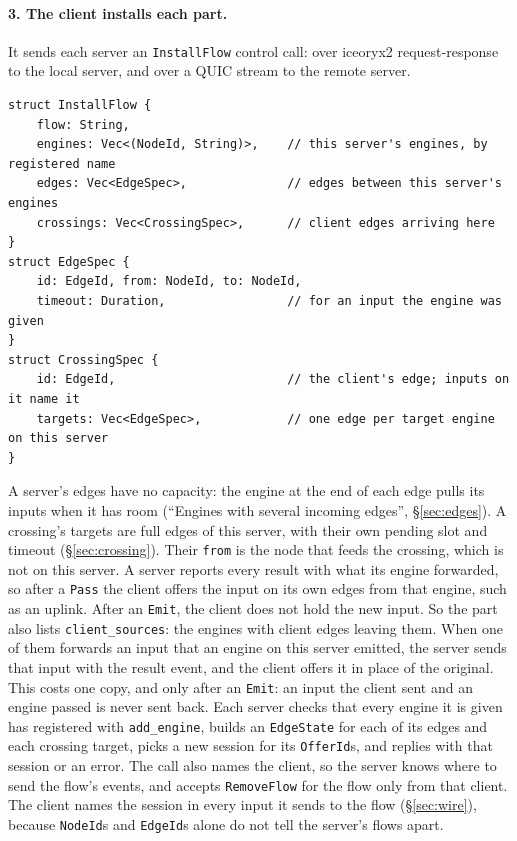 \documentclass[11pt]{article}
\newcommand{\code}[1]{\texttt{#1}}
\begin{document}
\paragraph{3. The client installs each part.} It sends each server an
\code{InstallFlow} control call: over iceoryx2 request-response to the local
server, and over a QUIC stream to the remote server.
\begin{lstlisting}
struct InstallFlow {
    flow: String,
    engines: Vec<(NodeId, String)>,    // this server's engines, by registered name
    edges: Vec<EdgeSpec>,              // edges between this server's engines
    crossings: Vec<CrossingSpec>,      // client edges arriving here
}
struct EdgeSpec {
    id: EdgeId, from: NodeId, to: NodeId,
    timeout: Duration,                 // for an input the engine was given
}
struct CrossingSpec {
    id: EdgeId,                        // the client's edge; inputs on it name it
    targets: Vec<EdgeSpec>,            // one edge per target engine on this server
}
\end{lstlisting}
A server's edges have no capacity: the engine at the end of each edge pulls
its inputs when it has room (``Engines with several incoming edges'',
\S\ref{sec:edges}). A crossing's targets are full edges of this server, with
their own pending slot and timeout (\S\ref{sec:crossing}). Their \code{from} is the node that feeds
the crossing, which is not on this server. A server reports every result
with what its engine forwarded, so after a \code{Pass} the client offers the
input on its own edges from that engine, such as an uplink. After an
\code{Emit}, the client does not hold the new input. So the part also lists
\code{client\_sources}: the engines with client edges leaving them. When one
of them forwards an input that an engine on this server emitted, the server
sends that input with the result event, and the client offers it in place of
the original. This costs one copy, and only after an \code{Emit}: an input the
client sent and an engine passed is never sent back. Each server checks that every engine it is given has
registered with \code{add\_engine}, builds an \code{EdgeState} for each of its
edges and each crossing target, picks a new session for its \code{OfferId}s,
and replies with that session or an error. The call also names the client,
so the server knows where to send the flow's events, and accepts
\code{RemoveFlow} for the flow only from that client. The client names the session in
every input it sends to the flow (\S\ref{sec:wire}), because \code{NodeId}s
and \code{EdgeId}s alone do not tell the server's flows apart.
\end{document}
